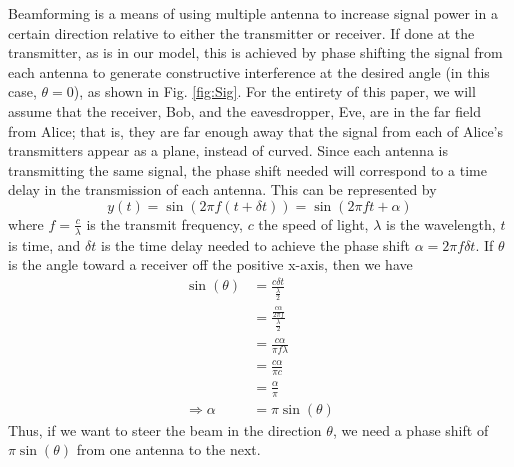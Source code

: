 \documentclass[letterpaper, 10 pt, conference]{ieeetran}  %
\theoremstyle{definition}
\theoremstyle{theorem}
\begin{document}
Beamforming is a means of using multiple antenna to increase signal power in a certain direction relative to either the transmitter or receiver.  
If done at the transmitter, as is in our model, this is achieved by phase shifting the signal from each antenna to generate constructive interference at the desired angle (in this case, $\theta=0$), as shown in Fig. \ref{fig:Sig}.  
For the entirety of this paper, we will assume that the receiver, Bob, and the eavesdropper, Eve, are in the far field from Alice; that is, they are far enough away that the signal from each of Alice's transmitters appear as a plane, instead of curved.  
Since each antenna is transmitting the same signal, the phase shift needed will correspond to a time delay in the transmission of each antenna.  
This can be represented by 
\begin{equation}
y(t) = \sin\left(2\pi f (t+\delta t)\right) = \sin\left(2 \pi f t + \alpha\right)
\end{equation}
where $f = \frac{c}{\lambda}$ is the transmit frequency, $c$ the speed of light, $\lambda$ is the wavelength, $t$ is time, and $\delta t$ is the time delay needed to achieve the phase shift $\alpha = 2\pi f \delta t$.  
If $\theta$ is the angle toward a receiver off the positive x-axis, then we have
\begin{align*}
\sin(\theta) &= \frac{c \delta t}{\frac{\lambda}{2}} \\
&= \frac{\frac{c\alpha}{2\pi f}}{\frac{\lambda}{2}} \\
&= \frac{c \alpha}{\pi f \lambda} \\
&= \frac{c\alpha}{\pi c} \\
&= \frac{\alpha}{\pi} \\
\Rightarrow \alpha &= \pi \sin(\theta)
\end{align*}
Thus, if we want to steer the beam in the direction $\theta$, we need a phase shift of $\pi \sin(\theta)$ from one antenna to the next.  
\end{document}
